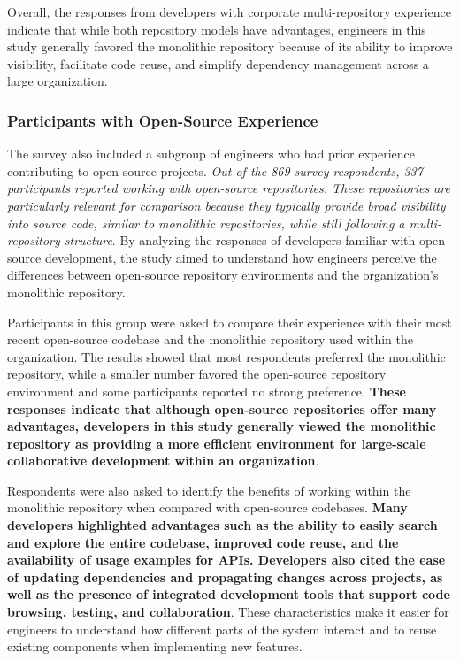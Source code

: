 Overall, the responses from developers with corporate multi-repository experience indicate that while both repository models have advantages, engineers in this study generally favored the monolithic repository because of its ability to improve visibility, facilitate code reuse, and simplify dependency management across a large organization.

\subsubsection{Participants with Open-Source Experience}

The survey also included a subgroup of engineers who had prior experience contributing to open-source projects. \textit{Out of the 869 survey respondents, 337 participants reported working with open-source repositories. These repositories are particularly relevant for comparison because they typically provide broad visibility into source code, similar to monolithic repositories, while still following a multi-repository structure}. By analyzing the responses of developers familiar with open-source development, the study aimed to understand how engineers perceive the differences between open-source repository environments and the organization's monolithic repository.

Participants in this group were asked to compare their experience with their most recent open-source codebase and the monolithic repository used within the organization. The results showed that most respondents preferred the monolithic repository, while a smaller number favored the open-source repository environment and some participants reported no strong preference. \textbf{These responses indicate that although open-source repositories offer many advantages, developers in this study generally viewed the monolithic repository as providing a more efficient environment for large-scale collaborative development within an organization}.

Respondents were also asked to identify the benefits of working within the monolithic repository when compared with open-source codebases. \textbf{Many developers highlighted advantages such as the ability to easily search and explore the entire codebase, improved code reuse, and the availability of usage examples for APIs. Developers also cited the ease of updating dependencies and propagating changes across projects, as well as the presence of integrated development tools that support code browsing, testing, and collaboration}. These characteristics make it easier for engineers to understand how different parts of the system interact and to reuse existing components when implementing new features.

